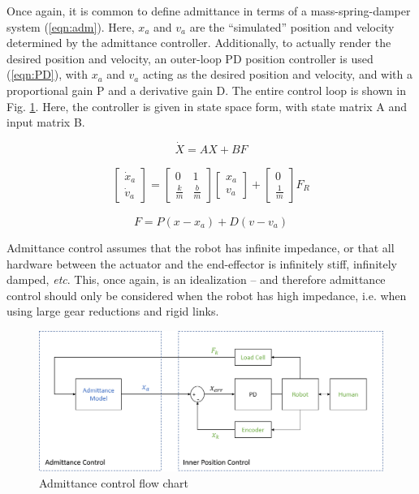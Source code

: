 \documentclass[12pt]{report}
\begin{document}
	Once again, it is common to define admittance in terms of a mass-spring-damper system (\ref{eqn:adm}). Here, $x_a$ and $v_a$ are the ``simulated'' position and velocity determined by the admittance controller. Additionally, to actually render the desired position and velocity, an outer-loop PD position controller is used (\ref{eqn:PD}), with $x_a$ and $v_a$ acting as the desired position and velocity, and with a proportional gain P and a derivative gain D. The entire control loop is shown in Fig. \ref{fig:adm_diagram}. Here, the controller is given in state space form, with state matrix A and input matrix B. 
	
	
	\begin{equation}
	\dot{X} = AX + BF
	\end{equation}
	
	\begin{gather} \label{eqn:adm}
	\begin{bmatrix}
    	\dot{x}_a \\
    	\dot{v}_a 
    \end{bmatrix} 
    =
    \begin{bmatrix}
    	0 & 1 \\
    	\frac{k}{m} & \frac{b}{m}
    \end{bmatrix} 
    \begin{bmatrix}
    	x_a \\
    	v_a
    \end{bmatrix}  
    +
    \begin{bmatrix}
    	0 \\
    	\frac{1}{m}
    \end{bmatrix}
    F_R   	
	\end{gather}
	
	\begin{equation} \label{eqn:PD}
	F = P(x - x_a) + D(v - v_a)
	\end{equation}

	Admittance control assumes that the robot has infinite impedance, or that all hardware between the actuator and the end-effector is infinitely stiff, infinitely damped, \textit{etc}. This, once again, is an idealization -- and therefore admittance control should only be considered when the robot has high impedance, i.e. when using large gear reductions and rigid links. 
	
		\begin{figure}[h] 
		\centering
		\includegraphics[width=\linewidth]{admittance_diagram}
		\caption{Admittance control flow chart}
		\label{fig:adm_diagram}
	\end{figure}
	
\end{document}
